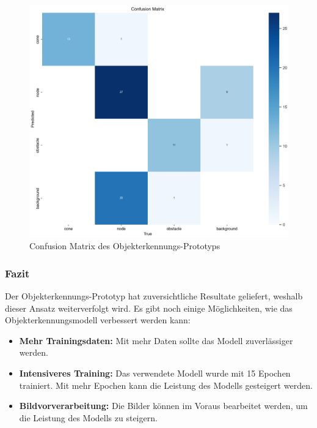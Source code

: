 \documentclass[../main.tex]{subfiles}
\begin{document}
\begin{figure}[H]
\includegraphics[width=\textwidth]{img/prototyping/objekterkennung/ConfusionMatrix.png}
\caption{Confusion Matrix des Objekterkennungs-Prototyps}
\label{img:objectdetection_prototype_confusion_matrix}
\end{figure}

\subsubsection{Fazit}

Der Objekterkennungs-Prototyp hat zuversichtliche Resultate geliefert, weshalb dieser Ansatz weiterverfolgt wird. Es gibt noch einige Möglichkeiten, wie das Objekterkennungsmodell verbessert werden kann:
\begin{itemize}
    \item \textbf{Mehr Trainingsdaten:} Mit mehr Daten sollte das Modell zuverlässiger werden.
    \item \textbf{Intensiveres Training:} Das verwendete Modell wurde mit 15 Epochen trainiert. Mit mehr Epochen kann die Leistung des Modells gesteigert werden.
    \item \textbf{Bildvorverarbeitung:} Die Bilder können im Voraus bearbeitet werden, um die Leistung des Modells zu steigern.
\end{itemize}
\end{document}
